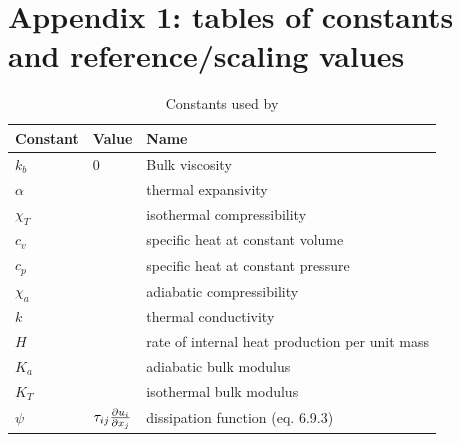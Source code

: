 \documentclass[document.tex]{subfiles}
\begin{document}
\section{Appendix 1: tables of constants and reference/scaling values}
\begin{table}[ht] 
    \centering
    \caption{Constants used by \cite{scto01}}
    \label{schubert constants}
    \begin{tabular}{lll}
        \toprule
        Constant & Value & Name \\
        \midrule
        $k_b$  & 0 & Bulk viscosity \\
        $\alpha$  &  & thermal expansivity \\
        $\chi_T$  &  & isothermal compressibility \\
        $c_v$  &  & specific heat at constant volume \\
        $c_p$  &  & specific heat at constant pressure \\
        $\chi_a$ & & adiabatic compressibility \\
        $k$  &  & thermal conductivity \\
        $H$  &   & rate of internal heat production per unit mass \\
        $K_a$ &  & adiabatic bulk modulus \\
        $K_T$ & & isothermal bulk modulus\\
        $\psi$ & $\tau_{ij}\pdv{u_i}{x_j}$ & dissipation function (eq. 6.9.3) \\
        \bottomrule
    \end{tabular}
\end{table}
\end{document}
